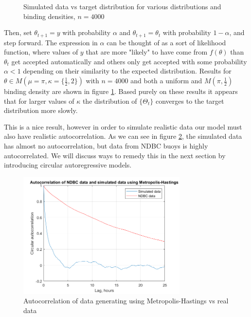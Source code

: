\documentclass[11pt]{article}
\numberwithin{equation}{section}
\numberwithin{figure}{section}
\begin{document}
\begin{figure}[h]
{}
\caption{Simulated data vs target distribution for various distributions and binding densities, $n=4000$}\label{fig:mhexamples}
\end{figure}

Then, set $\theta_{t+1}=y$ with probability $\alpha$ and $\theta_{t+1}=\theta_t$ with probability $1-\alpha$, and step forward. The expression in $\alpha$ can be thought of as a sort of likelihood function, where values of $y$ that are more "likely" to have come from $f(\theta)$ than $\theta_t$ get accepted automatically and others only get accepted with some probability $\alpha <1$ depending on their similarity to the expected distribution. Results for $\theta \in M(\mu = \pi, \kappa = \{\frac{1}{2}, 2\})$ with $n=4000$ and both a uniform and $M(\pi,\frac{1}{2})$ binding density are shown in figure \ref{fig:mhexamples}. Based purely on these results it appears that for larger values of $\kappa$ the distribution of $\{\Theta_t\}$ converges to the target distribution more slowly. 

This is a nice result, however in order to simulate realistic data our model must also have realistic autocorrelation. As we can see in figure \ref{fig:mh ac}, the simulated data has almost no autocorrelation, but data from NDBC buoys is highly autocorrelated. We will discuss ways to remedy this in the next section by introducing circular autoregressive models. 

\begin{figure}
\centering
\includegraphics[width=85mm]{New Folder/ac data v model.png}
\caption{Autocorrelation of data generating using Metropolis-Hastings vs real data}\label{fig:mh ac}
\end{figure}
\end{document}
